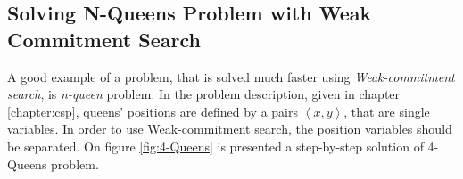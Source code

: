 \documentclass[../ThesisDoc]{subfiles}
\begin{document}
\providecommand{\rootdir}{..}


\subsection{Solving N-Queens Problem with Weak Commitment Search}
\label{sec:N-Queens-WCS}

A good example of a problem, that is solved much faster
using \emph{Weak-commitment search}, is \emph{n-queen} problem.
In the problem description, given in chapter \ref{chapter:csp}, queens' positions
are defined by a pairs $\left<x,y\right>$, that are single variables. In order to
use Weak-commitment search, the position variables should be separated.
On figure \ref{fig:4-Queens} is presented a step-by-step solution of
4-Queens problem.




\setcounter{subfiguregroup}{0}
\renewcommand\thesubfigure{\Roman{subfiguregroup}-\arabic{subfigure}}
\def\nextSubfigGroup{%
  \stepcounter{subfiguregroup}%
  \setcounter{subfigure}{0}%
}
\end{document}
